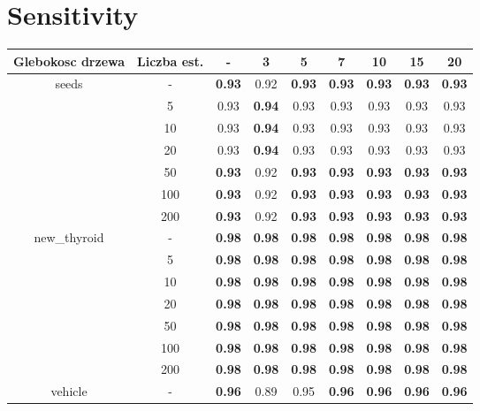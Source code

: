 \documentclass{article}%
\begin{document}
%
\section*{Sensitivity}%
\begin{longtable}{c|c|ccccccc}%
\hline%
Glebokosc drzewa&Liczba est.&{-}&3&5&7&10&15&20\\%
\hline%
\multirow{7}{*}{seeds}&{-}&\textbf{0.93}&0.92&\textbf{0.93}&\textbf{0.93}&\textbf{0.93}&\textbf{0.93}&\textbf{0.93}\\%
\cline{2%
-%
9}%
&5&0.93&\textbf{0.94}&0.93&0.93&0.93&0.93&0.93\\%
\cline{2%
-%
9}%
&10&0.93&\textbf{0.94}&0.93&0.93&0.93&0.93&0.93\\%
\cline{2%
-%
9}%
&20&0.93&\textbf{0.94}&0.93&0.93&0.93&0.93&0.93\\%
\cline{2%
-%
9}%
&50&\textbf{0.93}&0.92&\textbf{0.93}&\textbf{0.93}&\textbf{0.93}&\textbf{0.93}&\textbf{0.93}\\%
\cline{2%
-%
9}%
&100&\textbf{0.93}&0.92&\textbf{0.93}&\textbf{0.93}&\textbf{0.93}&\textbf{0.93}&\textbf{0.93}\\%
\cline{2%
-%
9}%
&200&\textbf{0.93}&0.92&\textbf{0.93}&\textbf{0.93}&\textbf{0.93}&\textbf{0.93}&\textbf{0.93}\\%
\hline%
\multirow{7}{*}{new\_thyroid}&{-}&\textbf{0.98}&\textbf{0.98}&\textbf{0.98}&\textbf{0.98}&\textbf{0.98}&\textbf{0.98}&\textbf{0.98}\\%
\cline{2%
-%
9}%
&5&\textbf{0.98}&\textbf{0.98}&\textbf{0.98}&\textbf{0.98}&\textbf{0.98}&\textbf{0.98}&\textbf{0.98}\\%
\cline{2%
-%
9}%
&10&\textbf{0.98}&\textbf{0.98}&\textbf{0.98}&\textbf{0.98}&\textbf{0.98}&\textbf{0.98}&\textbf{0.98}\\%
\cline{2%
-%
9}%
&20&\textbf{0.98}&\textbf{0.98}&\textbf{0.98}&\textbf{0.98}&\textbf{0.98}&\textbf{0.98}&\textbf{0.98}\\%
\cline{2%
-%
9}%
&50&\textbf{0.98}&\textbf{0.98}&\textbf{0.98}&\textbf{0.98}&\textbf{0.98}&\textbf{0.98}&\textbf{0.98}\\%
\cline{2%
-%
9}%
&100&\textbf{0.98}&\textbf{0.98}&\textbf{0.98}&\textbf{0.98}&\textbf{0.98}&\textbf{0.98}&\textbf{0.98}\\%
\cline{2%
-%
9}%
&200&\textbf{0.98}&\textbf{0.98}&\textbf{0.98}&\textbf{0.98}&\textbf{0.98}&\textbf{0.98}&\textbf{0.98}\\%
\hline%
\multirow{7}{*}{vehicle}&{-}&\textbf{0.96}&0.89&0.95&\textbf{0.96}&\textbf{0.96}&\textbf{0.96}&\textbf{0.96}\\%

\end{longtable}
\end{document}
